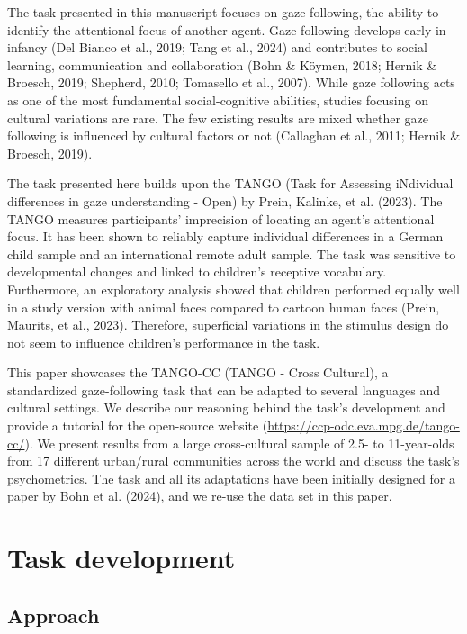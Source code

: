 \documentclass[
  man,mask,floatsintext]{apa7}
\begin{document}
The task presented in this manuscript focuses on gaze following, the ability to identify the attentional focus of another agent. Gaze following develops early in infancy (Del Bianco et al., 2019; Tang et al., 2024) and contributes to social learning, communication and collaboration (Bohn \& Köymen, 2018; Hernik \& Broesch, 2019; Shepherd, 2010; Tomasello et al., 2007). While gaze following acts as one of the most fundamental social-cognitive abilities, studies focusing on cultural variations are rare. The few existing results are mixed whether gaze following is influenced by cultural factors or not (Callaghan et al., 2011; Hernik \& Broesch, 2019).

The task presented here builds upon the TANGO (Task for Assessing iNdividual differences in gaze understanding - Open) by Prein, Kalinke, et al. (2023). The TANGO measures participants' imprecision of locating an agent's attentional focus. It has been shown to reliably capture individual differences in a German child sample and an international remote adult sample. The task was sensitive to developmental changes and linked to children's receptive vocabulary. Furthermore, an exploratory analysis showed that children performed equally well in a study version with animal faces compared to cartoon human faces (Prein, Maurits, et al., 2023). Therefore, superficial variations in the stimulus design do not seem to influence children's performance in the task.

This paper showcases the TANGO-CC (TANGO - Cross Cultural), a standardized gaze-following task that can be adapted to several languages and cultural settings. We describe our reasoning behind the task's development and provide a tutorial for the open-source website (\url{https://ccp-odc.eva.mpg.de/tango-cc/}). We present results from a large cross-cultural sample of 2.5- to 11-year-olds from 17 different urban/rural communities across the world and discuss the task's psychometrics. The task and all its adaptations have been initially designed for a paper by Bohn et al. (2024), and we re-use the data set in this paper.

\hypertarget{task-development}{%
\section{Task development}\label{task-development}}

\hypertarget{approach}{%
\subsection{Approach}\label{approach}}
\end{document}
